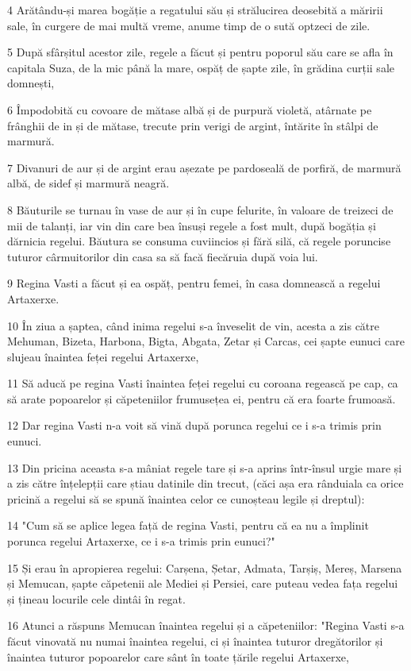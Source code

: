 \par 4 Arătându-și marea bogăție a regatului său și strălucirea deosebită a măririi sale, în curgere de mai multă vreme, anume timp de o sută optzeci de zile.
\par 5 După sfârșitul acestor zile, regele a făcut și pentru poporul său care se afla în capitala Suza, de la mic până la mare, ospăț de șapte zile, în grădina curții sale domnești,
\par 6 Împodobită cu covoare de mătase albă și de purpură violetă, atârnate pe frânghii de in și de mătase, trecute prin verigi de argint, întărite în stâlpi de marmură.
\par 7 Divanuri de aur și de argint erau așezate pe pardoseală de porfiră, de marmură albă, de sidef și marmură neagră.
\par 8 Băuturile se turnau în vase de aur și în cupe felurite, în valoare de treizeci de mii de talanți, iar vin din care bea însuși regele a fost mult, după bogăția și dărnicia regelui. Băutura se consuma cuviincios și fără silă, că regele poruncise tuturor cârmuitorilor din casa sa să facă fiecăruia după voia lui.
\par 9 Regina Vasti a făcut și ea ospăț, pentru femei, în casa domnească a regelui Artaxerxe.
\par 10 În ziua a șaptea, când inima regelui s-a înveselit de vin, acesta a zis către Mehuman, Bizeta, Harbona, Bigta, Abgata, Zetar și Carcas, cei șapte eunuci care slujeau înaintea feței regelui Artaxerxe,
\par 11 Să aducă pe regina Vasti înaintea feței regelui cu coroana regească pe cap, ca să arate popoarelor și căpeteniilor frumusețea ei, pentru că era foarte frumoasă.
\par 12 Dar regina Vasti n-a voit să vină după porunca regelui ce i s-a trimis prin eunuci.
\par 13 Din pricina aceasta s-a mâniat regele tare și s-a aprins într-însul urgie mare și a zis către înțelepții care știau datinile din trecut, (căci așa era rânduiala ca orice pricină a regelui să se spună înaintea celor ce cunoșteau legile și dreptul):
\par 14 "Cum să se aplice legea față de regina Vasti, pentru că ea nu a împlinit porunca regelui Artaxerxe, ce i s-a trimis prin eunuci?"
\par 15 Și erau în apropierea regelui: Carșena, Șetar, Admata, Tarșiș, Mereș, Marsena și Memucan, șapte căpetenii ale Mediei și Persiei, care puteau vedea fața regelui și țineau locurile cele dintâi în regat.
\par 16 Atunci a răspuns Memucan înaintea regelui și a căpeteniilor: "Regina Vasti s-a făcut vinovată nu numai înaintea regelui, ci și înaintea tuturor dregătorilor și înaintea tuturor popoarelor care sânt în toate țările regelui Artaxerxe,
